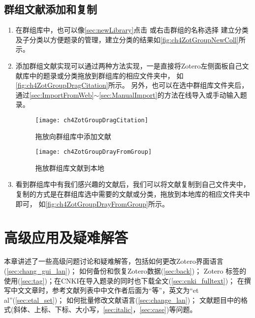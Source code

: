 \documentclass[theorem=false,mathfont=none,openany,sub3section]{easybook}
\begin{document}
\section{群组文献添加和复制}\label{sec:copyGroupLibrary}
\begin{enumerate}
	\item 在群组库中，也可以像\cref{sec:newLibrary}点击
	或右击群组的名称选择
	建立分类及子分类以方便题录的管理，建立分类的结果如\autoref{fig:ch4ZotGroupNewColl}所示。
	\item 添加群组文献实现可以通过两种方法实现，一是直接将Zotero左侧面板自己文献库中的题录或分类拖放到群组库的相应文件夹中，
	如\autoref{fig:ch4ZotGroupDragCitation}所示。
	另外，也可以在选中群组库文件夹后，通过\cref{sec:ImportFromWeb}$\sim$\cref{sec:ManualImport}的方法在线导入或手动输入题录。
	\begin{figure}[htbp]
		\centering 
		\begin{minipage}[t]{0.4\linewidth}
			\centering
			\texttt{[image: ch4ZotGroupDragCitation]}
			\caption{拖放向群组库中添加文献}
			\label{fig:ch4ZotGroupDragCitation}
		\end{minipage}
		\begin{minipage}[t]{0.4\linewidth}
			\centering
			\texttt{[image: ch4ZotGroupDrayFromGroup]}
			\caption{拖放群组库文献到本地}
			\label{fig:ch4ZotGroupDrayFromGroup}
		\end{minipage}
	\end{figure}
	
	
	\item 看到群组库中有我们感兴趣的文献后，我们可以将文献复制到自己文件夹中，
	复制的方式是在群组库选中需要的文献或分类，拖放到本地库的相应文件夹中即可，
	如\autoref{fig:ch4ZotGroupDrayFromGroup}所示。
\end{enumerate}

\chapter{高级应用及疑难解答}\label{ch:questions}
\setcounter{footnote}{0} %
本章讲述了一些高级问题讨论和疑难解答，包括如何更改Zotero界面语言(\cref{sec:chang_gui_lan})；
如何备份和恢复Zotero数据(\cref{sec:back})；
Zotero 标签的使用(\cref{sec:tag})；在CNKI在导入题录的同时也下载全文(\cref{sec:cnki_fulltext})；
在撰写中文文章时，参考文献列表中中文作者后面为“等”，英文为“et al”(\cref{sec:etal_set})；
如何批量修改文献语言(\cref{sec:change_lan})；
文献题目中的格式(斜体、上标、下标、大小写，\cref{sec:italic}，\cref{sec:case})等问题。
\end{document}
